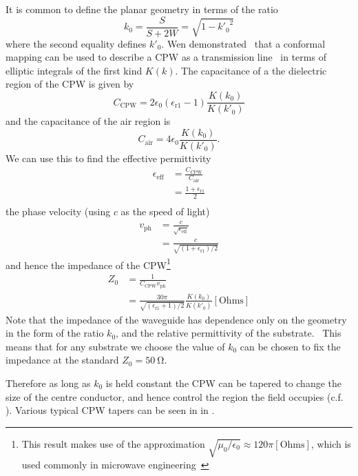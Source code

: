 It is common to define the planar geometry in terms of the
ratio~\cite{1127105, Simons2004}
\begin{equation}
  k_0 = \frac{S}{S+2W} = \sqrt{1-{k'_0}^2}
  \label{eqn:k0def}
\end{equation}
where the second equality defines $k'_0$.
%
Wen demonstrated~\cite{1127105} that a conformal mapping  can be used
to describe a CPW as a transmission line~\cite{Jackson1975} in terms of elliptic
integrals of the first kind $K(k)$. The capacitance of a the dielectric region
of the CPW is given by
\begin{equation}
  C_\mathrm{CPW} = 2\epsilon_0(\epsilon_\mathrm{r1}-1)\frac{K(k_0)}{K(k'_0)}
\end{equation}
and the capacitance of the air region is
\begin{equation}
  C_\mathrm{air} = 4\epsilon_0 \frac{K(k_0)}{K(k'_0)}.
\end{equation}
We can use this to find the effective permittivity 
\begin{align}
  \epsilon_\mathrm{eff} &= \frac{C_\mathrm{CPW}}{C_\mathrm{air}} \\
    &= \frac{1+ \epsilon_\mathrm{r1}}{2} \\
\end{align}
the phase velocity (using $c$ as the speed of light)
\begin{align}
  v_\mathrm{ph} &= \frac{c}{\sqrt{\epsilon_\mathrm{eff}}} \\
    &= \frac{c}{\sqrt{(1 + \epsilon_\mathrm{r1})/2}}
\end{align}
and hence the impedance of the CPW\footnote{This result makes use of the
approximation $\sqrt{\mu_0/\epsilon_0}\approx120\pi\mathrm{[Ohms]}$, which is
used commonly in microwave engineering~\cite{Collin2007}}
\begin{align}
  Z_0 &= \frac{1}{C_\mathrm{CPW} v_\mathrm{ph}} \\
    &= \frac{30 \pi}{\sqrt{(\epsilon_\mathrm{r1}+1)/2}} \frac{K(k_0)}{K(k'_0)}
    \mathrm{[Ohms]}
\end{align}
Note that the impedance of the waveguide has dependence only on the geometry in
the form of the ratio $k_0$, and the relative permittivity of the
substrate.~\cite{Simons2004} This means that for any substrate we choose the
value of $k_0$ can be chosen to fix the impedance at the standard $Z_0 =
\SI{50}{\ohm}$.

Therefore as long as $k_0$ is held constant the CPW can be tapered to change the
size of the centre conductor, and hence control the region the field occupies
(c.f. ).  Various typical CPW tapers  can be
seen in in .~\cite{Simons2004}

